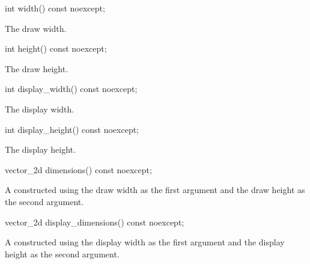 \begin{itemdecl}
int width() const noexcept;
\end{itemdecl}
\begin{itemdescr}
\pnum
\returns
The draw width.
\end{itemdescr}

\begin{itemdecl}
int height() const noexcept;
\end{itemdecl}
\begin{itemdescr}
\pnum
\returns
The draw height.
\end{itemdescr}

\begin{itemdecl}
int display_width() const noexcept;
\end{itemdecl}
\begin{itemdescr}
\pnum
\returns
The display width.
\end{itemdescr}

\begin{itemdecl}
int display_height() const noexcept;
\end{itemdecl}
\begin{itemdescr}
\pnum
\returns
The display height.
\end{itemdescr}

\begin{itemdecl}
vector_2d dimensions() const noexcept;
\end{itemdecl}
\begin{itemdescr}
\pnum
\returns
A  constructed using the draw width as the first argument and the draw height as the second argument.
\end{itemdescr}

\begin{itemdecl}
vector_2d display_dimensions() const noexcept;
\end{itemdecl}
\begin{itemdescr}
\pnum
\returns
A  constructed using the display width as the first argument and the display height as the second argument.
\end{itemdescr}

